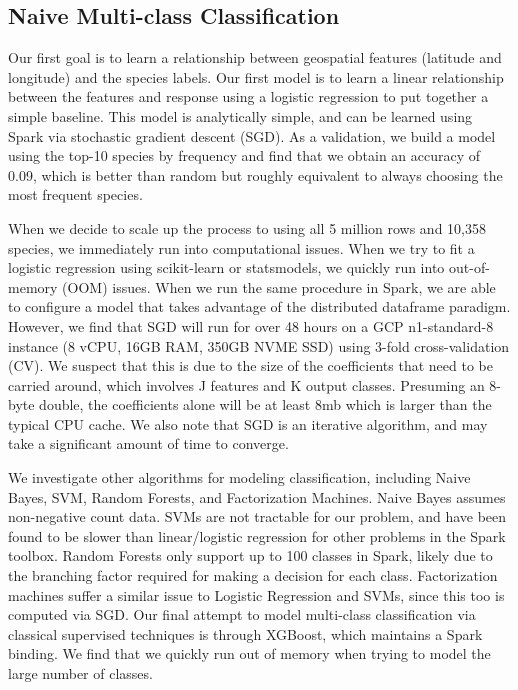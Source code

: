 \documentclass[]{style/ceurart}
\begin{document}
\subsection{Naive Multi-class Classification}

Our first goal is to learn a relationship between geospatial features (latitude and longitude) and the species labels. 
Our first model is to learn a linear relationship between the features and response using a logistic regression to put together a simple baseline. 
This model is analytically simple, and can be learned using Spark via stochastic gradient descent (SGD). 
As a validation, we build a model using the top-10 species by frequency and find that we obtain an accuracy of 0.09, which is better than random but roughly equivalent to always choosing the most frequent species.

When we decide to scale up the process to using all 5 million rows and 10,358 species, we immediately run into computational issues. 
When we try to fit a logistic regression using scikit-learn or statsmodels, we quickly run into out-of-memory (OOM) issues. 
When we run the same procedure in Spark, we are able to configure a model that takes advantage of the distributed dataframe paradigm. 
However, we find that SGD will run for over 48 hours on a GCP n1-standard-8 instance (8 vCPU, 16GB RAM, 350GB NVME SSD) using 3-fold cross-validation (CV). 
We suspect that this is due to the size of the coefficients that need to be carried around, which involves J features and K output classes. 
Presuming an 8-byte double, the coefficients alone will be at least 8mb which is larger than the typical CPU cache. 
We also note that SGD is an iterative algorithm, and may take a significant amount of time to converge.

We investigate other algorithms for modeling classification, including Naive Bayes, SVM, Random Forests, and Factorization Machines.
Naive Bayes assumes non-negative count data. 
SVMs are not tractable for our problem, and have been found to be slower than linear/logistic regression for other problems in the Spark toolbox. 
Random Forests only support up to 100 classes in Spark, likely due to the branching factor required for making a decision for each class. 
Factorization machines suffer a similar issue to Logistic Regression and SVMs, since this too is computed via SGD. 
Our final attempt to model multi-class classification via classical supervised techniques is through XGBoost, which maintains a Spark binding. 
We find that we quickly run out of memory when trying to model the large number of classes. 
\end{document}
